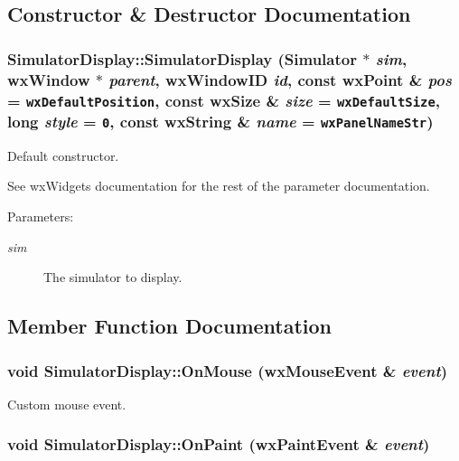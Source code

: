\subsection{Constructor \& Destructor Documentation}
\subsubsection{\setlength{\rightskip}{0pt plus 5cm}Simulator\-Display::Simulator\-Display (Simulator $\ast$ {\em sim}, wx\-Window $\ast$ {\em parent}, wx\-Window\-ID {\em id}, const wx\-Point \& {\em pos} = {\tt wxDefaultPosition}, const wx\-Size \& {\em size} = {\tt wxDefaultSize}, long {\em style} = {\tt 0}, const wx\-String \& {\em name} = {\tt wxPanelNameStr})}\label{classSimulatorDisplay_SimulatorDisplaya0}


Default constructor. 

See wx\-Widgets documentation for the rest of the parameter documentation. \begin{Desc}
\item[Parameters:]
\begin{description}
\item[{\em sim}]The simulator to display.\end{description}
\end{Desc}


\subsection{Member Function Documentation}
\subsubsection{\setlength{\rightskip}{0pt plus 5cm}void Simulator\-Display::On\-Mouse (wx\-Mouse\-Event \& {\em event})}\label{classSimulatorDisplay_SimulatorDisplaya2}


Custom mouse event. 

\subsubsection{\setlength{\rightskip}{0pt plus 5cm}void Simulator\-Display::On\-Paint (wx\-Paint\-Event \& {\em event})}\label{classSimulatorDisplay_SimulatorDisplaya1}


